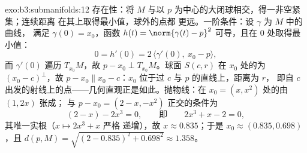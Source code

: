 \begin{solution}{exo:b3:submanifolds:12}
存在性：将 $M$ 与以
$p$ 为中心的大闭球相交，得一非空紧集；连续距离
在其上取得最小值，球外的点都
更远。一阶条件：设 $\gamma$ 为 $M$ 中的曲线，
满足 $\gamma(0) = x_0$，函数 $h(t) = \norm{\gamma(t)
- p}^2$ 可导，且在 $0$ 处取得最小值：
\[
0 = h'(0) = 2\,\langle\gamma'(0),\ x_0 - p\rangle,
\]
而 $\gamma'(0)$ 遍历 $T_{x_0}M$，故 $p - x_0 \perp
T_{x_0}M$。球面 $S(c, r)$ 在 $x_0$ 处的为
$(x_0 - c)^\perp$，故 $p - x_0 \parallel x_0 - c$：$x_0$
位于过 $c$ 与 $p$ 的直线上，距离为 $r$，
即自 $c$ 出发的射线上的点——几何直观正是如此。抛物线：在
$x_0 = (x, x^2)$ 处的由 $(1, 2x)$ 张成；
与 $p - x_0 = (2 - x, -x^2)$ 正交的条件为
\[
(2 - x) - 2x^3 = 0,
\qquad\text{即}\qquad 2x^3 + x - 2 = 0,
\]
其唯一实根（$x \mapsto 2x^3 + x$ 严格
递增），故 $x \approx 0.835$；于是 $x_0 \approx (0.835,
0.698)$，且 $d(p, M) = \sqrt{(2 - 0.835)^2 + 0.698^2}
\approx 1.358$。
\end{solution}

